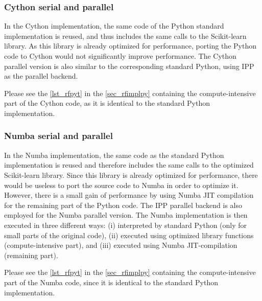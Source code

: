 %
%
%
\subsubsection{Cython serial and parallel} %
\label{sec_rfimplcy}

In the Cython implementation, the same code of the Python standard implementation is reused, and thus includes the same calls to the Scikit-learn library. As this library is already optimized for performance, porting the Python code to Cython would not significantly improve performance. The Cython parallel version is also similar to the corresponding standard Python, using IPP as the parallel backend.

Please see the \autoref {lst_rfpyt} in the \autoref {sec_rfimplpy} containing the compute-intensive part of the Cython code, as it is identical to the standard Python implementation.

%
%
%
\subsubsection{Numba serial and parallel} %
\label{sec_rfimplnumb}

In the Numba implementation, the same code as the standard Python implementation is reused and therefore includes the same calls to the optimized Scikit-learn library. Since this library is already optimized for performance, there would be useless to port the source code to Numba in order to optimize it. However, there is a small gain of performance by using Numba JIT compilation for the remaining part of the Python code. The IPP parallel backend is also employed for the Numba parallel version. The Numba implementation is then executed in three different ways: 
(i) interpreted by standard Python (only for small parts of the original code), 
(ii) executed using optimized library functions (compute-intensive part), and 
(iii) executed using Numba JIT-compilation (remaining part).

Please see the \autoref {lst_rfpyt} in the \autoref {sec_rfimplpy} containing the compute-intensive part of the Numba code, since it is identical to the standard Python implementation.
